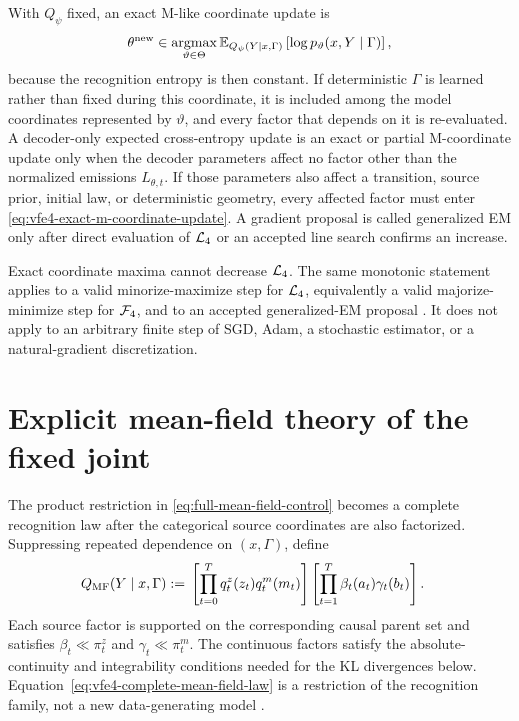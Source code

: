 With $Q_\psi$ fixed, an exact M-like coordinate update is
\begin{equation}
\theta^{\mathrm{new}}
\in\operatorname*{argmax}_{\vartheta\in\Theta}
\mathbb E_{Q_\psi(Y\mid x,\Gamma)}
\left[
\log p_\vartheta(x,Y\mid\Gamma)
\right],
\label{eq:vfe4-exact-m-coordinate-update}
\end{equation}
because the recognition entropy is then constant. If deterministic $\Gamma$ is learned rather than fixed during this coordinate, it is included among the model coordinates represented by $\vartheta$, and every factor that depends on it is re-evaluated. A decoder-only expected cross-entropy update is an exact or partial M-coordinate update only when the decoder parameters affect no factor other than the normalized emissions $L_{\theta,t}$. If those parameters also affect a transition, source prior, initial law, or deterministic geometry, every affected factor must enter \cref{eq:vfe4-exact-m-coordinate-update}. A gradient proposal is called generalized EM only after direct evaluation of $\mathcal L_4$ or an accepted line search confirms an increase.

Exact coordinate maxima cannot decrease $\mathcal L_4$. The same monotonic statement applies to a valid minorize-maximize step for $\mathcal L_4$, equivalently a valid majorize-minimize step for $\mathcal F_4$, and to an accepted generalized-EM proposal \citep{Dempster1977,Neal1998}. It does not apply to an arbitrary finite step of SGD, Adam, a stochastic estimator, or a natural-gradient discretization.

\section{Explicit mean-field theory of the fixed joint}

The product restriction in \cref{eq:full-mean-field-control} becomes a complete recognition law after the categorical source coordinates are also factorized. Suppressing repeated dependence on $(x,\Gamma)$, define
\begin{equation}
\begin{aligned}
Q_{\mathrm{MF}}(Y\mid x,\Gamma)
:={}&\left[
\prod_{t=0}^{T}q_t^z(z_t)q_t^m(m_t)
\right]\left[
\prod_{t=1}^{T}\beta_t(a_t)\gamma_t(b_t)
\right].
\end{aligned}
\label{eq:vfe4-complete-mean-field-law}
\end{equation}
Each source factor is supported on the corresponding causal parent set and satisfies $\beta_t\ll\pi_t^z$ and $\gamma_t\ll\pi_t^m$. The continuous factors satisfy the absolute-continuity and integrability conditions needed for the KL divergences below. Equation~\eqref{eq:vfe4-complete-mean-field-law} is a restriction of the recognition family, not a new data-generating model \citep{Blei2017,Wainwright2008}.

